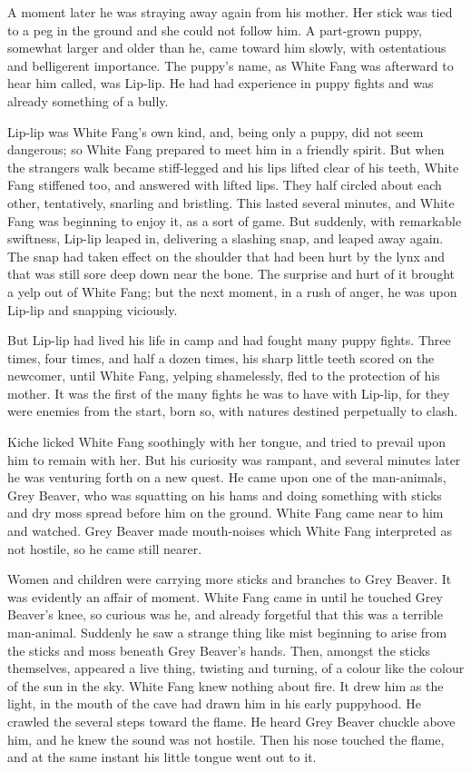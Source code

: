 \documentclass[10pt]{book}
\begin{document}
A moment later he was straying away again from his mother. Her stick
was tied to a peg in the ground and she could not follow him. A
part-grown puppy, somewhat larger and older than he, came toward him
slowly, with ostentatious and belligerent importance. The puppy’s name,
as White Fang was afterward to hear him called, was Lip-lip. He had had
experience in puppy fights and was already something of a bully.

Lip-lip was White Fang’s own kind, and, being only a puppy, did not
seem dangerous; so White Fang prepared to meet him in a friendly
spirit. But when the strangers walk became stiff-legged and his lips
lifted clear of his teeth, White Fang stiffened too, and answered with
lifted lips. They half circled about each other, tentatively, snarling
and bristling. This lasted several minutes, and White Fang was
beginning to enjoy it, as a sort of game. But suddenly, with remarkable
swiftness, Lip-lip leaped in, delivering a slashing snap, and leaped
away again. The snap had taken effect on the shoulder that had been
hurt by the lynx and that was still sore deep down near the bone. The
surprise and hurt of it brought a yelp out of White Fang; but the next
moment, in a rush of anger, he was upon Lip-lip and snapping viciously.

But Lip-lip had lived his life in camp and had fought many puppy
fights. Three times, four times, and half a dozen times, his sharp
little teeth scored on the newcomer, until White Fang, yelping
shamelessly, fled to the protection of his mother. It was the first of
the many fights he was to have with Lip-lip, for they were enemies from
the start, born so, with natures destined perpetually to clash.

Kiche licked White Fang soothingly with her tongue, and tried to
prevail upon him to remain with her. But his curiosity was rampant, and
several minutes later he was venturing forth on a new quest. He came
upon one of the man-animals, Grey Beaver, who was squatting on his hams
and doing something with sticks and dry moss spread before him on the
ground. White Fang came near to him and watched. Grey Beaver made
mouth-noises which White Fang interpreted as not hostile, so he came
still nearer.

Women and children were carrying more sticks and branches to Grey
Beaver. It was evidently an affair of moment. White Fang came in until
he touched Grey Beaver’s knee, so curious was he, and already forgetful
that this was a terrible man-animal. Suddenly he saw a strange thing
like mist beginning to arise from the sticks and moss beneath Grey
Beaver’s hands. Then, amongst the sticks themselves, appeared a live
thing, twisting and turning, of a colour like the colour of the sun in
the sky. White Fang knew nothing about fire. It drew him as the light,
in the mouth of the cave had drawn him in his early puppyhood. He
crawled the several steps toward the flame. He heard Grey Beaver
chuckle above him, and he knew the sound was not hostile. Then his nose
touched the flame, and at the same instant his little tongue went out
to it.
\end{document}
